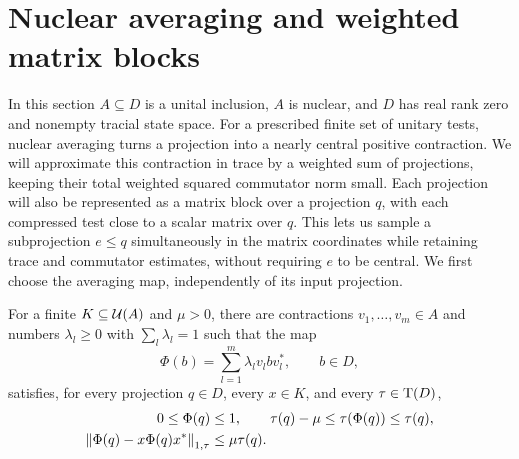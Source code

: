 \section{Nuclear averaging and weighted matrix blocks}\label{r:sec:weighted}

In this section \(A\subseteq D\) is a unital inclusion, \(A\) is nuclear,
and \(D\) has real rank zero and nonempty tracial state space. For a
prescribed finite set of unitary tests, nuclear averaging turns a
projection into a nearly central positive contraction. We will approximate
this contraction in trace by a weighted sum of projections, keeping their
total weighted squared commutator norm small. Each projection will also
be represented as a matrix block over a projection \(q\), with each
compressed test close to a scalar matrix over \(q\). This lets us sample
a subprojection \(e\leq q\) simultaneously in the matrix coordinates
while retaining trace and commutator estimates, without requiring \(e\)
to be central. We first choose the averaging map, independently of its
input projection.

\begin{lemma}\label{r:weighted:diagonal}
For a finite \(K\subseteq\mathcal U(A)\) and \(\mu>0\), there are contractions
\(v_1,\ldots,v_m\in A\) and numbers \(\lambda_l\geq0\) with
\(\sum_l\lambda_l=1\) such that the map
\[
 \Phi(b)=\sum_{l=1}^m\lambda_l v_lbv_l^*,\qquad b\in D,
\]
satisfies, for every projection \(q\in D\), every \(x\in K\), and every
\(\tau\in\operatorname T(D)\),
\begin{align}
 0\leq\Phi(q)&\leq1,\qquad
 \tau(q)-\mu\leq\tau(\Phi(q))\leq\tau(q),\label{r:eq:diagonal-mass}\\
 \left\|\Phi(q)-x\Phi(q)x^*\right\|_{1,\tau}
 &\leq\mu\tau(q).\label{r:eq:diagonal-central}
\end{align}
\end{lemma}

